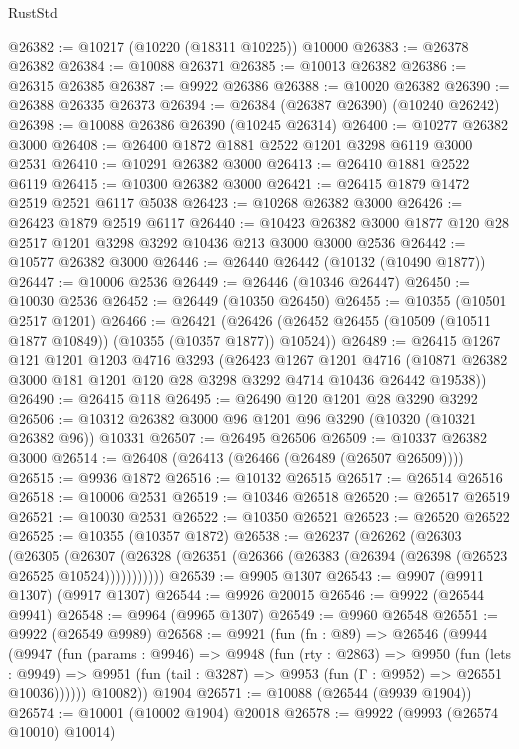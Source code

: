 \begin{lexlean}{RustStd}
\begin{coremodule}
@26382 := @10217 (@10220 (@18311 @10225)) @10000
@26383 := @26378 @26382
@26384 := @10088 @26371
@26385 := @10013 @26382
@26386 := @26315 @26385
@26387 := @9922 @26386
@26388 := @10020 @26382
@26390 := @26388 @26335 @26373
@26394 := @26384 (@26387 @26390) (@10240 @26242)
@26398 := @10088 @26386 @26390 (@10245 @26314)
@26400 := @10277 @26382 @3000
@26408 := @26400 @1872 @1881 @2522 @1201 @3298 @6119 @3000 @2531
@26410 := @10291 @26382 @3000
@26413 := @26410 @1881 @2522 @6119
@26415 := @10300 @26382 @3000
@26421 := @26415 @1879 @1472 @2519 @2521 @6117 @5038
@26423 := @10268 @26382 @3000
@26426 := @26423 @1879 @2519 @6117
@26440 := @10423 @26382 @3000 @1877 @120 @28 @2517 @1201 @3298 @3292 @10436 @213 @3000 @3000 @2536
@26442 := @10577 @26382 @3000
@26446 := @26440 @26442 (@10132 (@10490 @1877))
@26447 := @10006 @2536
@26449 := @26446 (@10346 @26447)
@26450 := @10030 @2536
@26452 := @26449 (@10350 @26450)
@26455 := @10355 (@10501 @2517 @1201)
@26466 := @26421
    (@26426 (@26452 @26455 (@10509 (@10511 @1877 @10849)) (@10355 (@10357 @1877)) @10524))
@26489 := @26415
    @1267
    @121
    @1201
    @1203
    @4716
    @3293
    (@26423
      @1267
      @1201
      @4716
      (@10871 @26382 @3000 @181 @1201 @120 @28 @3298 @3292 @4714 @10436 @26442 @19538))
@26490 := @26415 @118
@26495 := @26490 @120 @1201 @28 @3290 @3292
@26506 := @10312 @26382 @3000 @96 @1201 @96 @3290 (@10320 (@10321 @26382 @96)) @10331
@26507 := @26495 @26506
@26509 := @10337 @26382 @3000
@26514 := @26408 (@26413 (@26466 (@26489 (@26507 @26509))))
@26515 := @9936 @1872
@26516 := @10132 @26515
@26517 := @26514 @26516
@26518 := @10006 @2531
@26519 := @10346 @26518
@26520 := @26517 @26519
@26521 := @10030 @2531
@26522 := @10350 @26521
@26523 := @26520 @26522
@26525 := @10355 (@10357 @1872)
@26538 := @26237
    (@26262
      (@26303
        (@26305
          (@26307 (@26328 (@26351 (@26366 (@26383 (@26394 (@26398 (@26523 @26525 @10524)))))))))))
@26539 := @9905 @1307
@26543 := @9907 (@9911 @1307) (@9917 @1307)
@26544 := @9926 @20015
@26546 := @9922 (@26544 @9941)
@26548 := @9964 (@9965 @1307)
@26549 := @9960 @26548
@26551 := @9922 (@26549 @9989)
@26568 := @9921
    (fun (fn : @89) =>
    @26546
      (@9944
        (@9947
          (fun (params : @9946) =>
          @9948
            (fun (rty : @2863) =>
            @9950
              (fun (lets : @9949) =>
              @9951 (fun (tail : @3287) => @9953 (fun (Γ : @9952) => @26551 @10036))))))
        @10082))
    @1904
@26571 := @10088 (@26544 (@9939 @1904))
@26574 := @10001 (@10002 @1904) @20018
@26578 := @9922 (@9993 (@26574 @10010) @10014)

\end{coremodule}
\end{lexlean}
